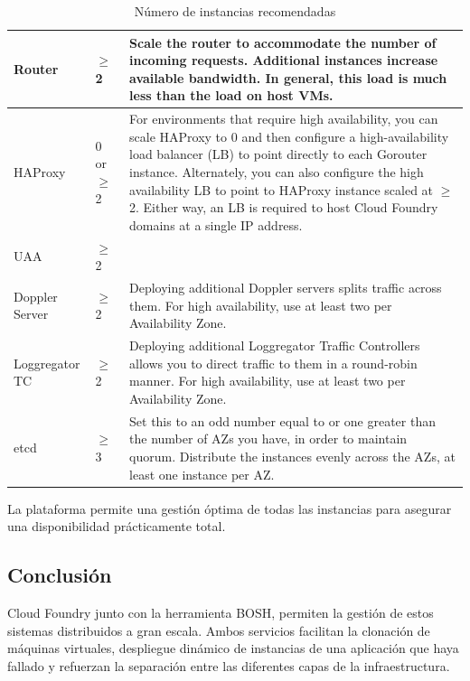 \documentclass[a4paper,11pt]{article}
\begin{document}
\begin{table}[htp]
\begin{tabular}{ | p{3cm} | p{3cm} | p{10cm} |}
Router & $\geq$ 2 & Scale the router to accommodate the number of incoming requests. Additional instances increase available bandwidth. In general, this load is much less than the load on host VMs. \\\hline
HAProxy & 0 or $\geq$ 2 & For environments that require high availability, you can scale HAProxy to 0 and then configure a high-availability load balancer (LB) to point directly to each Gorouter instance. Alternately, you can also configure the high availability LB to point to HAProxy instance scaled at $\geq$ 2. Either way, an LB is required to host Cloud Foundry domains at a single IP address. \\\hline
UAA & $\geq$ 2 &  \\\hline
Doppler Server & $\geq$ 2 & Deploying additional Doppler servers splits traffic across them. For high availability, use at least two per Availability Zone. \\\hline
Loggregator TC & $\geq$ 2 & Deploying additional Loggregator Traffic Controllers allows you to direct traffic to them in a round-robin manner. For high availability, use at least two per Availability Zone. \\\hline
etcd & $\geq$ 3 & Set this to an odd number equal to or one greater than the number of AZs you have, in order to maintain quorum. Distribute the instances evenly across the AZs, at least one instance per AZ. \\ \hline
\end{tabular}
\caption{Número de instancias recomendadas}
\label{tab:instancias}
\end{table}


La plataforma permite una gestión óptima de todas las instancias para asegurar una disponibilidad prácticamente total.

\subsection{Conclusión}
Cloud Foundry junto con la herramienta BOSH, permiten la gestión de estos sistemas distribuidos a gran escala. Ambos servicios facilitan la clonación de máquinas virtuales, despliegue dinámico de instancias de una aplicación que haya fallado y refuerzan la separación entre las diferentes capas de la infraestructura.
\end{document}
